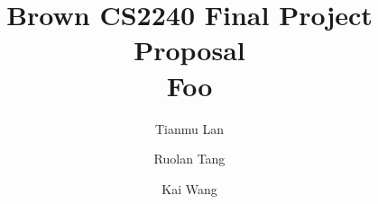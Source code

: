 \documentclass[acmtog, table, dvipsnames]{acmart}
\begin{document}
\title{\textbf{Brown CS2240 Final Project Proposal} \\
       Foo}
\author{Tianmu Lan}
\author{Ruolan Tang}
\author{Kai Wang}
\maketitle


\end{document}
